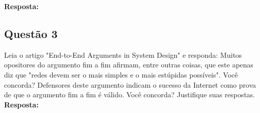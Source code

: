 \noindent
\textbf{Resposta:}


\subsection{Questão 3}
Leia o artigo "End-to-End Arguments in System Design" e responda:
Muitos opositores do argumento fim a fim afirmam, entre outras coisas, que este
apenas diz que "redes devem ser o mais simples e o mais estúpidas possíveis".
Você concorda? Defensores deste argumento indicam o sucesso da Internet como
prova de que o argumento fim a fim é válido. Você concorda? Justifique suas
respostas.\\

\noindent
\textbf{Resposta:}